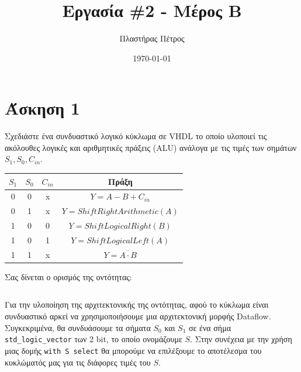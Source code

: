 \documentclass[11pt, a4paper]{report}
\begin{document}
\author{Πλαστήρας Πέτρος}
\title{Εργασία \#2 - Μέρος B}
\date{\today}
\maketitle

\section{Άσκηση 1}
Σχεδιάστε ένα συνδυαστικό λογικό κύκλωμα σε VHDL το οποίο υλοποιεί τις ακόλουθες λογικές και αριθμητικές πράξεις (ALU) ανάλογα με τις τιμές των σημάτων $S_1, S_0, C_{in}$.

\begin{center}
	\begin{tabular}{|c|c|c|c|}
		\hline
		$S_1$ & $S_0$ & $C_{in}$ & Πράξη                           \\
		\hline
		0     & 0     & x        & $Y = A - B + C_{in}$            \\
		0     & 1     & x        & $Y = Shift Right Arithmetic(A)$ \\
		1     & 0     & 0        & $Y = Shift Logical Right(B)$    \\
		1     & 0     & 1        & $Y = Shift Logical Left(A)$     \\
		1     & 1     & x        & $Y = \overline{A \cdot B}$      \\
		\hline
	\end{tabular}
\end{center}

Σας δίνεται ο ορισμός της οντότητας:
\inputminted[firstline=5, lastline=14]{vhdl}{./code/part-2/alu-1/alu.vhdl}

Για την υλοποίηση της αρχιτεκτονικής της οντότητας, αφού το κύκλωμα είναι συνδυαστικό αρκεί να χρησιμοποιήσουμε μια αρχιτεκτονική μορφής Dataflow. Συγκεκριμένα, θα συνδυάσουμε τα σήματα $S_0$ και $S_1$ σε ένα σήμα
\texttt{std_logic_vector} των 2 bit, το οποίο ονομάζουμε $S$.
Στην συνέχεια με την χρήση μιας δομής \texttt{with S select} θα μπορούμε να επιλέξουμε το αποτέλεσμα του κυκλώματός μας για τις διάφορες τιμές του $S$.
\end{document}
